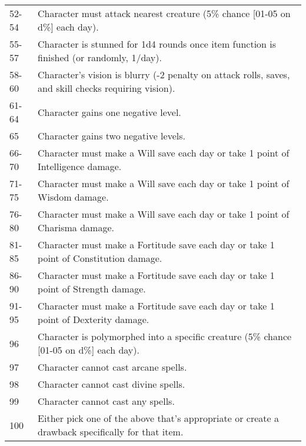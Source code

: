 \begin{tabularx}{\linewidth}{lX}
52-54        & Character must attack nearest creature (5\% chance {[}01-05 on d\%{]} each day).                        \\
55-57        & Character is stunned for 1d4 rounds once item function is finished (or randomly, 1/day).                \\
58-60        & Character's vision is blurry (-2 penalty on attack rolls, saves, and skill checks requiring vision).    \\
61-64        & Character gains one negative level.                                                                     \\
65           & Character gains two negative levels.                                                                    \\
66-70        & Character must make a Will save each day or take 1 point of Intelligence damage.                        \\
71-75        & Character must make a Will save each day or take 1 point of Wisdom damage.                              \\
76-80        & Character must make a Will save each day or take 1 point of Charisma damage.                            \\
81-85        & Character must make a Fortitude save each day or take 1 point of Constitution damage.                   \\
86-90        & Character must make a Fortitude save each day or take 1 point of Strength damage.                       \\
91-95        & Character must make a Fortitude save each day or take 1 point of Dexterity damage.                      \\
96           & Character is polymorphed into a specific creature (5\% chance {[}01-05 on d\%{]} each day).             \\
97           & Character cannot cast arcane spells.                                                                    \\
98           & Character cannot cast divine spells.                                                                    \\
99           & Character cannot cast any spells.                                                                       \\
100          & Either pick one of the above that's appropriate or create a drawback specifically for that item.       
\end{tabularx}